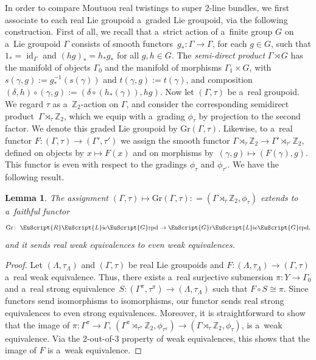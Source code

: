 \documentclass[10pt,a4paper]{amsart}
\numberwithin{equation}{section}
\newtheorem{Lemma}[Theorem]{Lemma}
\def\mathscr#1{\EuScript{#1}}
\def\Z {\mathbb{Z}}
\def\liegrpd{\mathscr{L}\text{ie}\mathscr{G}\text{rpd}}
\newcommand{\id}{\operatorname{id}}
\def\Gr{\mathrm{Gr}}
\def\Rliegrpd{\normalfont\mathscr{R}\liegrpd}
\def\Grliegrpd{\normalfont\mathscr{G}\mathrm{r}\liegrpd}
\begin{document}
In order to compare Moutuou real twistings to super 2-line bundles, we first associate to each real Lie groupoid a~graded Lie groupoid, via the following construction. First of all, we recall that a~strict action of a~finite group $G$ on a~Lie groupoid $\Gamma$ consists of smooth functors~${g_* \colon \Gamma \to \Gamma}$, for each $g\in G$, such
 that $1_* = \id_{\Gamma}$ and $(hg)_* = h_* g_*$ for all $g,h \in G$. The \emph{semi-direct product} $\Gamma \rtimes G$ has the manifold of objects $\Gamma_0$ and the manifold of morphisms $\Gamma_1 \times G$, with~${s(\gamma,g) := g_{*}^{-1}(s(\gamma))}$ and $t(\gamma,g) := t(\gamma)$, and composition $(\delta,h) \circ (\gamma,g) := (\delta \circ (h_{*}(\gamma)), hg)$.
Now let $(\Gamma,\tau)$ be a~real groupoid. We regard $\tau$ as a~$\Z_2$-action on $\Gamma$, and consider the corresponding semidirect product~${\Gamma \rtimes_{\tau} \Z_2}$, which we equip with a~grading $\phi_{\tau}$ by projection to the second factor. We denote this graded Lie groupoid by $\Gr(\Gamma,\tau)$. Likewise, to a~real functor $F \colon (\Gamma,\tau) \to (\Gamma',\tau')$ we assign the smooth
functor $\Gamma \rtimes_{\tau} \Z_2 \to \Gamma' \rtimes_{\tau'} \Z_2$, defined on objects by $x \mapsto F(x)$ and on morphisms by~${(\gamma,g) \mapsto (F(\gamma),g)}$. This functor is even with respect to the gradings $\phi_{\tau}$ and $\phi_{\tau'}$.
We have the following result.
\begin{Lemma}
\label{lemma: Real Morita equivalences give rise to even weak equivalences between the associated semidirect product groupoids}
 The assignment $(\Gamma,\tau) \mapsto \Gr(\Gamma,\tau) : =(\Gamma \rtimes_{\tau} \Z_2,\phi_{\tau})$ extends to a~faithful functor
 \begin{equation*}
 \Gr\colon\ \Rliegrpd \to\Grliegrpd,
 \end{equation*}
 and it sends real weak equivalences to even weak equivalences.
\end{Lemma}

\begin{proof}
 Let $(\Lambda,\tau_{\Lambda})$ and $(\Gamma,\tau)$ be real Lie groupoids and $F \colon (\Lambda,\tau_{\Lambda}) \to (\Gamma,\tau)$ a~real weak equivalence.
 Thus, there exists a~real surjective
 submersion $\pi \colon Y \to \Gamma_0$ and a~real strong equivalence~${S \colon (\Gamma^\pi,\tau^\pi) \to (\Lambda,\tau_{\Lambda})}$ such that $F \circ S \cong \pi$.
Since functors send isomorphisms to isomorphisms, our functor sends real strong equivalences to even strong equivalences. Moreover, it is straightforward to show that the image of $\pi\colon \Gamma^{\pi} \to \Gamma$,
$
 (\Gamma^\pi \rtimes_{\tau^\pi} \Z_2,\phi_{\tau^{\pi}}) \to (\Gamma \rtimes_{\tau} \Z_2,\phi_{\tau})$,
 is a~weak equivalence. Via the 2-out-of-3 property of weak equivalences, this shows that the image of $F$ is a~weak equivalence.
\end{proof}
\end{document}
